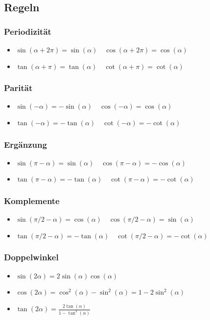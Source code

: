 \documentclass[a4paper,10pt]{article}
\begin{document}
\subsection{Regeln}
\subsubsection{Periodizität}
\begin{itemize}
 \item $\sin(\alpha + 2 \pi) = \sin(\alpha) \quad \cos(\alpha + 2 \pi) = \cos(\alpha)$
 \item $\tan(\alpha + \pi) = \tan(\alpha) \quad \cot(\alpha + \pi) = \cot(\alpha)$
\end{itemize}

\subsubsection{Parität}
\begin{itemize}
 \item $\sin(-\alpha) = - \sin(\alpha) \quad \cos(-\alpha) = \cos(\alpha)$
 \item $\tan(-\alpha) = - \tan(\alpha) \quad \cot(-\alpha) = - \cot(\alpha)$
\end{itemize}

\subsubsection{Ergänzung}
\begin{itemize}
 \item $\sin(\pi - \alpha) = \sin(\alpha) \quad \cos(\pi - \alpha) = - \cos(\alpha)$
 \item $\tan(\pi - \alpha) = -\tan(\alpha) \quad \cot(\pi - \alpha) = - \cot(\alpha)$
\end{itemize}


\subsubsection{Komplemente}
\begin{itemize}
 \item $\sin(\pi/2 - \alpha) = \cos(\alpha) \quad \cos(\pi/2 - \alpha) = \sin(\alpha)$
 \item $\tan(\pi/2 - \alpha) = -\tan(\alpha) \quad \cot(\pi/2 - \alpha) = -\cot(\alpha)$
\end{itemize}

\subsubsection{Doppelwinkel}
\begin{itemize}
 \item $\sin(2\alpha) = 2 \sin(\alpha) \cos(\alpha)$
 \item $\cos(2\alpha) = \cos^2(\alpha) - \sin^2(\alpha) = 1 - 2 \sin^2(\alpha)$
 \item $\tan(2\alpha) = \frac{2\tan(\alpha)}{1 - \tan^2(\alpha)}$
\end{itemize}
\end{document}

